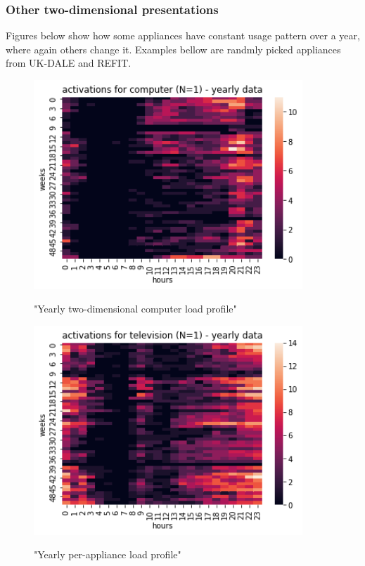 \subsubsection{Other two-dimensional presentations}

Figures below show how some appliances have constant usage pattern 
over a year, where again others change it. Examples bellow are randmly picked appliances
from UK-DALE and REFIT. 

\begin{figure}[H]
	\centering
	\caption{"Yearly two-dimensional computer load profile"}
	\includegraphics[width=0.9\textwidth]{../Figures/LPS/HM_Ywh_comp.png}
	\label{fig:HM_Ywh_comp}
\end{figure}
\begin{figure}[H]
	\centering
	\caption{"Yearly per-appliance load profile"}
	\includegraphics[width=0.9\textwidth]{../Figures/LPS/HM_Ywh_tv.png}
	\label{fig:HM_Ywh_tv}
\end{figure}
